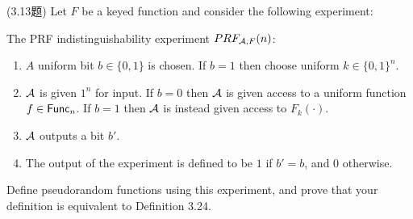 \begin{questions}
    \question (3.13题) Let $F$ be a keyed function and consider the following experiment:

        \indent The PRF indistinguishability experiment $PRF_{\mathcal{A},F}(n)$:

        \begin{enumerate}
            \item $A$ uniform bit $b\in\{0,1\}$ is chosen. If $b=1$ then choose uniform $k\in\{0,1\}^n$.
            \item $\mathcal{A}$ is given $1^n$ for input. If $b=0$ then $\mathcal{A}$ is given access to a uniform function $f\in\mathsf{Func}_n$. If $b=1$ then $\mathcal{A}$ is instead given access to $F_k(\cdot)$.
            \item $\mathcal{A}$ outputs a bit $b'$.
            \item The output of the experiment is defined to be $1$ if $b'=b$, and $0$ otherwise.
        \end{enumerate}

        Define pseudorandom functions using this experiment, and prove that your definition is equivalent to Definition 3.24.


\end{questions}
